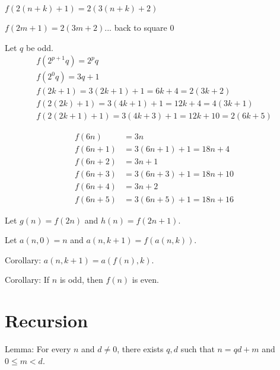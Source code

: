 \(f(2(n+k)+1) = 2(3(n+k)+2)\)

\(f(2m+1) = 2(3m+2)\)... back to square 0

Let \(q\) be odd.
\begin{align*}
    f(2^{p+1} q) = 2^p q
    \\
    f(2^0 q) = 3q + 1
    \\
    f(2k+1) = 3(2k+1) + 1 = 6k+4 = 2(3k+2)
    \\
    f(2(2k)+1) = 3(4k+1) + 1 = 12k+4 = 4(3k+1)
    \\
    f(2(2k+1)+1) = 3(4k+3) + 1 = 12k+10 = 2(6k+5)
\end{align*}

\begin{align*}
    f(6n) &= 3n
    \\
    f(6n+1) &= 3(6n+1)+1 = 18n+4
    \\
    f(6n+2) &= 3n+1
    \\
    f(6n+3) &= 3(6n+3) + 1 = 18n+10
    \\
    f(6n+4) &= 3n+2
    \\
    f(6n+5) &= 3(6n+5) + 1 = 18n+16
\end{align*}

Let \(g(n) = f(2n)\) and \(h(n) = f(2n+1)\).

Let \(a(n,0) = n\) and \(a(n,k+1) = f(a(n,k))\).

Corollary: \(a(n,k+1) = a(f(n),k)\).

Corollary: If \(n\) is odd, then \(f(n)\) is even.

\section{Recursion}

Lemma: For every \(n\) and \(d \neq 0\), there exists \(q,d\) such that \(n = qd+m\) and \(0 \le m < d\).

